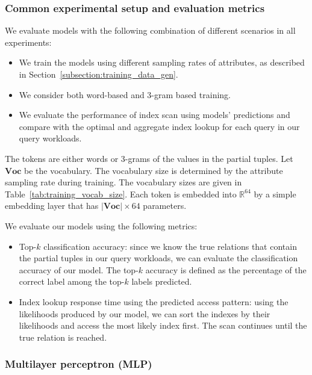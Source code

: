 \documentclass[conference]{IEEEtran}
\begin{document}
\subsubsection{Common experimental setup and evaluation metrics}
 We evaluate models with the following combination of different scenarios in all experiments:
\begin{itemize}
	\item We train the models using different sampling rates of attributes, as described in Section~\ref{subsection:training_data_gen}.
	\item We consider both word-based and 3-gram based training.
	\item We evaluate the performance of index scan using models' predictions
	and compare with the optimal and aggregate index lookup for each query in our query workloads.
\end{itemize}

The tokens are either words or 3-grams of the values in the partial tuples.  Let $\mathbf{Voc}$ be the vocabulary.  The vocabulary size is determined by the attribute sampling rate during training. The vocabulary sizes are given in Table~\ref{tab:training_vocab_size}. Each token is embedded into $\mathbb{R}^{64}$ by a simple embedding layer that has
$|\mathbf{Voc}|\times 64$ parameters.

We evaluate our models using the following metrics:
\begin{itemize}
\item Top-$k$ classification accuracy: since we know the true relations that contain the partial tuples in our query workloads, we can evaluate the classification accuracy of our model.  The top-$k$ accuracy is defined as the percentage of the correct label among the top-$k$ labels predicted.
\item Index lookup response time using the predicted access pattern: using the likelihoods produced by our model, we can sort the indexes by their likelihoods and access the most likely index first. The scan continues until the true relation is reached.
\end{itemize}

\subsubsection{Multilayer perceptron (MLP)}
\label{subsection:expt_mlp}
\end{document}
